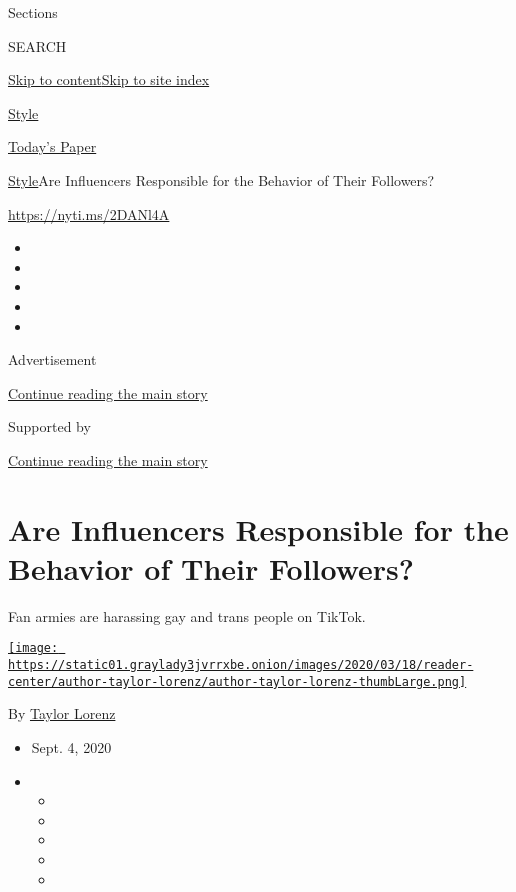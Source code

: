 Sections

SEARCH

\protect\hyperlink{site-content}{Skip to
content}\protect\hyperlink{site-index}{Skip to site index}

\href{https://www.nytimes3xbfgragh.onion/section/style}{Style}

\href{https://myaccount.nytimes3xbfgragh.onion/auth/login?response_type=cookie\&client_id=vi}{}

\href{https://www.nytimes3xbfgragh.onion/section/todayspaper}{Today's
Paper}

\href{/section/style}{Style}\textbar{}Are Influencers Responsible for
the Behavior of Their Followers?

\url{https://nyti.ms/2DANl4A}

\begin{itemize}
\item
\item
\item
\item
\item
\end{itemize}

Advertisement

\protect\hyperlink{after-top}{Continue reading the main story}

Supported by

\protect\hyperlink{after-sponsor}{Continue reading the main story}

\hypertarget{are-influencers-responsible-for-the-behavior-of-their-followers}{%
\section{Are Influencers Responsible for the Behavior of Their
Followers?}\label{are-influencers-responsible-for-the-behavior-of-their-followers}}

Fan armies are harassing gay and trans people on TikTok.

\href{https://www.nytimes3xbfgragh.onion/by/taylor-lorenz}{\texttt{[image: https://static01.graylady3jvrrxbe.onion/images/2020/03/18/reader-center/author-taylor-lorenz/author-taylor-lorenz-thumbLarge.png]}}

By \href{https://www.nytimes3xbfgragh.onion/by/taylor-lorenz}{Taylor
Lorenz}

\begin{itemize}
\item
  Sept. 4, 2020
\item
  \begin{itemize}
  \item
  \item
  \item
  \item
  \item
  \end{itemize}
\end{itemize}


